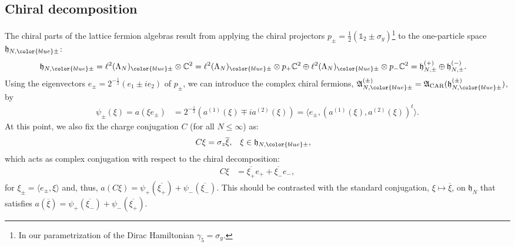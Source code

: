 \documentclass[a4paper, 11pt]{article}
\newcommand{\fA}{\mathfrak{A}}\newcommand{\cA}{\mathcal{A}}\newcommand{\dA}{\mathds{A}}\newcommand{\sA}{\mathscr{A}}
\newcommand{\fh}{\mathfrak{h}}
\newcommand{\CC}{\mathbb{C}}\newcommand{\C}{\mathbb{C}}
\newcommand{\ltwo}{\ell^{2}}
\DeclareMathOperator{\1}{\mathds{1}}
\DeclareMathOperator{\CAR}{\textup{CAR}}
\begin{document}
\subsection{Chiral decomposition}
\label{sec:ffchiral}
The chiral parts of the lattice fermion algebras result from applying the chiral projectors $p_{\pm} = \tfrac{1}{2}(\mathds{1}_{2}\pm\sigma_{y})$\footnote{In our parametrization of the Dirac Hamiltonian $\gamma_{5} = \sigma_{y}$.} to the one-particle space $\fh_{N,{\color{blue}\pm}}$:
\begin{align}
\label{eq:chiral1p}
\fh_{N,{\color{blue}\pm}} & = \ltwo(\Lambda_{N})_{{\color{blue}\pm}}\otimes\CC^{2}= \ltwo(\Lambda_{N})_{{\color{blue}\pm}}\otimes p_{+}\CC^{2}\oplus\ltwo(\Lambda_{N})_{{\color{blue}\pm}}\otimes p_{-}\CC^{2} = \fh^{(+)}_{N,\pm}\oplus\fh^{(-)}_{N,\pm}.
\end{align}
Using the eigenvectors $e_{\pm} = 2^{-\frac{1}{2}}(e_{1}\pm i e_{2})$ of $p_{\pm}$, we can introduce the complex chiral fermions, $\fA^{(\pm)}_{N,{\color{blue}\pm}} = \fA_{\CAR}(\fh^{(\pm)}_{N,{\color{blue}\pm}})$, by
\begin{align}
\label{eq:chiralF}
\psi_{\pm}(\xi) = a(\xi e_{\pm}) & = 2^{-\frac{1}{2}}(a^{(1)}(\xi) \mp i a^{(2)}(\xi)) = \langle e_{\pm}, (a^{(1)}(\xi), a^{(2)}(\xi))^{t}\rangle.
\end{align}
At this point, we also fix the charge conjugation $C$ (for all $N\leq\infty$) as:
\begin{align}
\label{eq:majconj}
C\xi & = \sigma_{z}\overline{\xi}, & \xi & \in\fh_{N,{\color{blue}\pm}},
\end{align}
which acts as complex conjugation with respect to the chiral decomposition:
\begin{align}
\label{eq:chiralconj}
C\xi & = \overline{\xi_{+}}e_{+}+\overline{\xi_{-}}e_{-},
\end{align}
for $\xi_{\pm} = \langle e_{\pm},\xi\rangle$ and, thus, $a(C\xi) = \psi_{+}(\overline{\xi_{+}})+\psi_{-}(\overline{\xi_{-}})$. This should be contrasted with the standard conjugation, $\xi\mapsto\overline{\xi}$, on $\fh_{N}$ that satisfies $a(\overline{\xi}) = \psi_{+}(\overline{\xi_{-}})+\psi_{-}(\overline{\xi_{+}})$.
\end{document}
